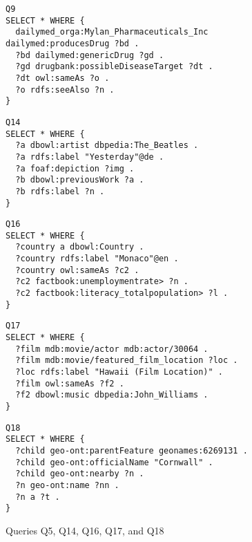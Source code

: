 \begin{figure}[htb]
  \centering
\begin{verbatim}
Q9
SELECT * WHERE {
  dailymed_orga:Mylan_Pharmaceuticals_Inc dailymed:producesDrug ?bd . 
  ?bd dailymed:genericDrug ?gd .
  ?gd drugbank:possibleDiseaseTarget ?dt . 
  ?dt owl:sameAs ?o .
  ?o rdfs:seeAlso ?n .
}
\end{verbatim}
 
\begin{verbatim}
Q14
SELECT * WHERE {
  ?a dbowl:artist dbpedia:The_Beatles .
  ?a rdfs:label "Yesterday"@de .
  ?a foaf:depiction ?img .
  ?b dbowl:previousWork ?a .
  ?b rdfs:label ?n .
}
\end{verbatim}

\begin{verbatim}
Q16
SELECT * WHERE {
  ?country a dbowl:Country .
  ?country rdfs:label "Monaco"@en .
  ?country owl:sameAs ?c2 .
  ?c2 factbook:unemploymentrate> ?n .
  ?c2 factbook:literacy_totalpopulation> ?l .
}
\end{verbatim}

\begin{verbatim}
Q17
SELECT * WHERE {
  ?film mdb:movie/actor mdb:actor/30064 .
  ?film mdb:movie/featured_film_location ?loc .
  ?loc rdfs:label "Hawaii (Film Location)" .
  ?film owl:sameAs ?f2 .
  ?f2 dbowl:music dbpedia:John_Williams .
}
\end{verbatim}

\begin{verbatim}
Q18
SELECT * WHERE {
  ?child geo-ont:parentFeature geonames:6269131 .
  ?child geo-ont:officialName "Cornwall" .
  ?child geo-ont:nearby ?n .
  ?n geo-ont:name ?nn .
  ?n a ?t .
}
\end{verbatim}

  \caption{Queries Q5, Q14, Q16, Q17, and Q18}
\label{fig:qtp5}
\end{figure}


